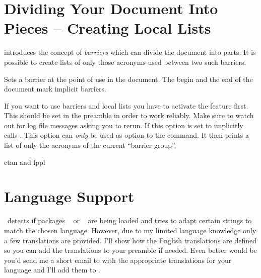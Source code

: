 \documentclass{acro-manual}
\begin{document}
\section{Dividing Your Document Into Pieces -- Creating Local
  Lists}\label{sec:divid-your-docum}

\acro{} introduces the concept of \emph{barriers} which can
divide the document into parts. It is possible to create lists of only those
acronyms used between two such barriers.
\begin{commands}
    Sets a barrier at the point of use in the document.  The begin and the end
    of the document mark implicit barriers.
\end{commands}
\begin{options}
    If you want to use barriers and local lists you have to
    activate the feature first.  This should be set in the preamble in order
    to work reliably.  Make sure to watch out for log file messages asking you
    to rerun.
    If this option is set to   implicitly calls
    .
    This option can \emph{only} be used as option to the 
    command. It then prints a list of only the acronyms of the current
    \enquote{barrier group}.
\end{options}

\begin{example}
  \acbarrier
  \ac{ctan} and \ac{lppl}
  \acbarrier
\end{example}

\section{Language Support}
\acro\ detects if packages ~\cite{pkg:babel} or
~\cite{pkg:babel} are being loaded and tries to adapt certain
strings to match the chosen language.  However, due to my limited language
knowledge only a few translations are provided.  I'll show how the English
translations are defined so you can add the translations to your preamble if
needed.  Even better would be you'd send me a short email to
 with the appropriate translations for your
language and I'll add them to \acro.

\begin{sourcecode}
\end{sourcecode}
\end{document}
